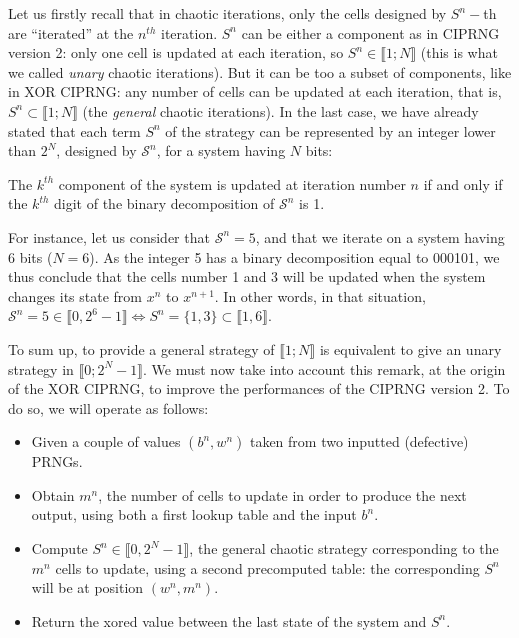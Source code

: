 Let us firstly recall that in chaotic iterations, only the cells designed by $S^{n}-$th are ``iterated'' 
at the $n^{th}$ iteration.
$S^n$ can be either a component as in CIPRNG version 2: only one cell is updated at each iteration, 
so $S^n \in \llbracket 1;N \rrbracket$ (this is what we called \emph{unary} chaotic
iterations).
But it can be too a subset of components, like in XOR CIPRNG: any number of cells can be 
updated at each iteration, that is, $S^n \subset \llbracket 1;N \rrbracket$
(the \emph{general} chaotic iterations).
In the last case, we have already stated that each term $S^n$ of the strategy can be represented by an integer lower than $2^N$, 
designed by $\mathcal{S}^n$, for a system having $N$ bits: 

\begin{center}
The $k^{th}$ component of the system is 
updated at iteration number $n$ if and only if the $k^{th}$ digit of the binary decomposition of $\mathcal{S}^n$ is 1.
\end{center}

\begin{example}
For instance, let us consider that $\mathcal{S}^n=5$, and that we iterate on a system having 6 bits ($N=6$).
As the integer 5 has a binary decomposition equal to 000101, we thus conclude that the cells number 1 and 3 
will be updated when the system changes its state from $x^{n}$ to $x^{n+1}$.
In other words, in that situation, $\mathcal{S}^n=5 \in \llbracket 0,2^6-1\rrbracket \Leftrightarrow 
S^n = \{1, 3\} \subset \llbracket 1, 6 \rrbracket$.
\end{example}

To sum up, to provide a general strategy of $\llbracket 1;N \rrbracket$ is equivalent to 
give an unary strategy in $\llbracket 0; 2^N-1 \rrbracket$.
We must now take into account this remark, at the origin of the XOR CIPRNG,
to improve the performances of the CIPRNG version 2. To do so, we will operate
as follows:
\begin{itemize}
\item Given a couple of values $(b^n,w^n)$ taken from two inputted (defective) PRNGs. 
\item Obtain $m^n$, the number of cells to update in order to produce the next output, using both a
first lookup table and the input $b^n$.
\item Compute $S^n \in  \llbracket 0, 2^N-1 \rrbracket$, the general chaotic 
strategy corresponding to the $m^n$ cells to update, using a second precomputed
table: the corresponding $S^n$ will be at position $(w^n, m^n)$.
\item Return the xored value between the last state of the system and $S^n$.
\end{itemize}

